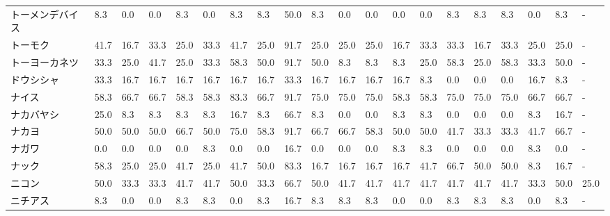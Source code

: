 \begin{tabular}{llllllllllllllllllll}
トーメンデバイス        &    8.3 &    0.0 &       0.0 &       8.3 &        0.0 &    8.3 &    8.3 &   50.0 &     8.3 &     0.0 &    0.0 &   0.0 &    0.0 &     8.3 &     8.3 &   8.3 &   0.0 &   8.3 &     - \\
トーモク            &   41.7 &   16.7 &      33.3 &      25.0 &       33.3 &   41.7 &   25.0 &   91.7 &    25.0 &    25.0 &   25.0 &  16.7 &   33.3 &    33.3 &    16.7 &  33.3 &  25.0 &  25.0 &     - \\
トーヨーカネツ         &   33.3 &   25.0 &      41.7 &      25.0 &       33.3 &   58.3 &   50.0 &   91.7 &    50.0 &     8.3 &    8.3 &   8.3 &   25.0 &    58.3 &    25.0 &  58.3 &  33.3 &  50.0 &     - \\
ドウシシャ           &   33.3 &   16.7 &      16.7 &      16.7 &       16.7 &   16.7 &   16.7 &   33.3 &    16.7 &    16.7 &   16.7 &  16.7 &    8.3 &     0.0 &     0.0 &   0.0 &  16.7 &   8.3 &     - \\
ナイス             &   58.3 &   66.7 &      66.7 &      58.3 &       58.3 &   83.3 &   66.7 &   91.7 &    75.0 &    75.0 &   75.0 &  58.3 &   58.3 &    75.0 &    75.0 &  75.0 &  66.7 &  66.7 &     - \\
ナカバヤシ           &   25.0 &    8.3 &       8.3 &       8.3 &        8.3 &   16.7 &    8.3 &   66.7 &     8.3 &     0.0 &    0.0 &   8.3 &    8.3 &     0.0 &     0.0 &   0.0 &   8.3 &  16.7 &     - \\
ナカヨ             &   50.0 &   50.0 &      50.0 &      66.7 &       50.0 &   75.0 &   58.3 &   91.7 &    66.7 &    66.7 &   58.3 &  50.0 &   50.0 &    41.7 &    33.3 &  33.3 &  41.7 &  66.7 &     - \\
ナガワ             &    0.0 &    0.0 &       0.0 &       0.0 &        8.3 &    0.0 &    0.0 &   16.7 &     0.0 &     0.0 &    0.0 &   8.3 &    8.3 &     0.0 &     0.0 &   0.0 &   8.3 &   0.0 &     - \\
ナック             &   58.3 &   25.0 &      25.0 &      41.7 &       25.0 &   41.7 &   50.0 &   83.3 &    16.7 &    16.7 &   16.7 &  16.7 &   41.7 &    66.7 &    50.0 &  50.0 &   8.3 &  16.7 &     - \\
ニコン             &   50.0 &   33.3 &      33.3 &      41.7 &       41.7 &   50.0 &   33.3 &   66.7 &    50.0 &    41.7 &   41.7 &  41.7 &   41.7 &    41.7 &    41.7 &  41.7 &  33.3 &  50.0 &  25.0 \\
ニチアス            &    8.3 &    0.0 &       0.0 &       8.3 &        8.3 &    0.0 &    8.3 &   16.7 &     8.3 &     8.3 &    8.3 &   0.0 &    0.0 &     8.3 &     8.3 &   8.3 &   0.0 &   8.3 &     - \\

\end{tabular}
